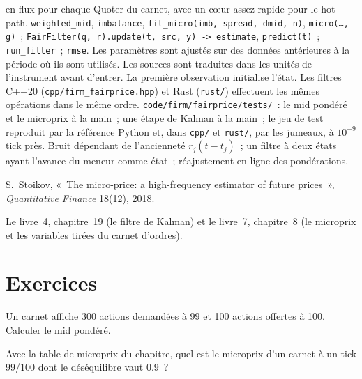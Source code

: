 \begin{build}
  en flux pour chaque Quoter du carnet, avec un cœur assez rapide pour le hot path.
 \texttt{weighted\_mid}, \texttt{imbalance}, \texttt{fit\_micro(imb, spread, dmid, n)}, \texttt{micro(\dots, g)}~;
\texttt{FairFilter(q, r).update(t, src, y) -> estimate}, \texttt{predict(t)}~; \texttt{run\_filter}~; \texttt{rmse}.
 Les paramètres sont ajustés sur des données antérieures à la période où ils sont utilisés. Les sources sont traduites dans les unités de l'instrument
avant d'entrer. La première observation initialise l'état. Les filtres C++20 (\texttt{cpp/firm\_fairprice.hpp}) et Rust (\texttt{rust/}) effectuent les
mêmes opérations dans le même ordre.
 \texttt{code/firm/fairprice/tests/}~: le mid pondéré et le microprix à la main~; une étape de Kalman à la main~; le jeu de test
reproduit par la référence Python et, dans \texttt{cpp/} et \texttt{rust/}, par les jumeaux, à $10^{-9}$ tick près.
 Bruit dépendant de l'ancienneté $r_j(t-t_j)$~; un filtre à deux états ayant l'avance du meneur comme état~; réajustement en ligne des pondérations.
\end{build}

\begin{omsources}
\item S.~Stoikov, «~The micro-price: a high-frequency estimator of future prices~», \emph{Quantitative Finance} 18(12), 2018.
\item Le livre~4, chapitre~19 (le filtre de Kalman) et le livre~7, chapitre~8 (le microprix et les variables tirées du carnet d'ordres).
\end{omsources}

\section{Exercices}

\begin{exercise}[$\star$]\label{exo:hf:fair-value:1}
Un carnet affiche 300 actions demandées à 99 et 100 actions offertes à 100. Calculer le mid pondéré.
\end{exercise}

\begin{exercise}[$\star$]\label{exo:hf:fair-value:2}
Avec la table de microprix du chapitre, quel est le microprix d'un carnet à un tick 99/100 dont le déséquilibre vaut 0.9~?
\end{exercise}

